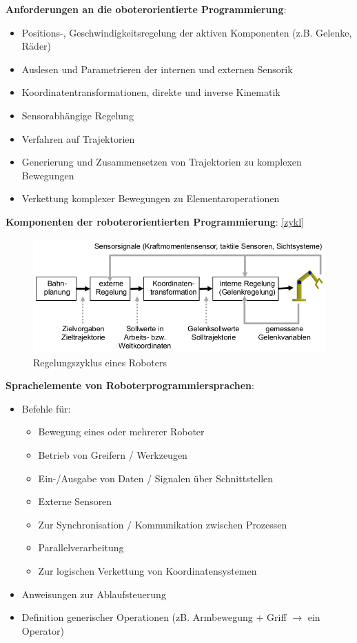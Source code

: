 \textbf{Anforderungen an die oboterorientierte Programmierung}:
\begin{itemize}
\item Positions-, Geschwindigkeitsregelung der aktiven Komponenten (z.B. Gelenke, Räder)
\item Auslesen und Parametrieren der internen und externen Sensorik
\item Koordinatentransformationen, direkte und inverse Kinematik
\item Sensorabhängige Regelung
\item Verfahren auf Trajektorien
\item Generierung und Zusammensetzen von Trajektorien zu komplexen Bewegungen
\item Verkettung komplexer Bewegungen zu Elementaroperationen
\end{itemize}
\textbf{Komponenten der roboterorientierten Programmierung}: \autoref{zykl}
\begin{figure}[h!]\centering 
\includegraphics[width=0.7\linewidth]{figures/ch01_zykl.png}
\caption{Regelungszyklus eines Roboters}
\label{zykl}
\end{figure}
\textbf{Sprachelemente von Roboterprogrammiersprachen}:
\begin{itemize}
\item Befehle für:
\begin{itemize}
\item Bewegung eines oder mehrerer Roboter
\item Betrieb von Greifern / Werkzeugen
\item Ein-/Ausgabe von Daten / Signalen über Schnittstellen
\item Externe Sensoren
\item Zur Synchronisation / Kommunikation zwischen Prozessen
\item Parallelverarbeitung
\item Zur logischen Verkettung von Koordinatensystemen
\end{itemize}
\item Anweisungen zur Ablaufsteuerung
\item Definition generischer Operationen (zB. Armbewegung + Griff $\rightarrow$ ein Operator)
\end{itemize}
